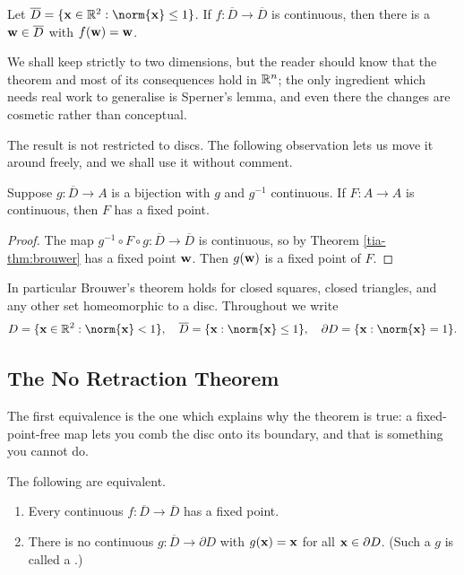 \documentclass[a4paper]{scrartcl}
\newcommand{\dbar}{\overline{D}}
\begin{document}
\begin{theorem}\label{tia-thm:brouwer}
	Let $\dbar = \{\vv{x} \in \R^2 : \norm{\vv{x}} \leq 1\}$. If $f : \dbar \to \dbar$ is continuous, then there is a $\vv{w} \in \dbar$ with $f(\mathbf{w}) = \mathbf{w}$.
\end{theorem}

We shall keep strictly to two dimensions, but the reader should know that the theorem and most of its consequences hold in $\mathbb{R}^n$; the only ingredient which needs real work to generalise is Sperner's lemma, and even there the changes are cosmetic rather than conceptual.

The result is not restricted to discs. The following observation lets us move it around freely, and we shall use it without comment.

\begin{lemma}\label{lem:homeo-transfer}
	Suppose $g : \dbar \to A$ is a bijection with $g$ and $g^{-1}$ continuous. If $F : A \to A$ is continuous, then $F$ has a fixed point.
\end{lemma}

\begin{proof}
	The map $g^{-1} \circ F \circ g : \dbar \to \dbar$ is continuous, so by Theorem \ref{tia-thm:brouwer} has a fixed point $\mathbf{w}$. Then $g(\mathbf{w})$ is a fixed point of $F$.
\end{proof}

In particular Brouwer's theorem holds for closed squares, closed triangles, and any other set homeomorphic to a disc. Throughout we write
$$D = \{\vv{x} \in \R^2 : \norm{\vv{x}}<1\}, \quad \dbar = \{\vv{x}: \norm{\vv{x}}\leq 1\}, \quad \partial D = \{\vv{x} : \norm{\vv{x}}=1\}.$$

\subsection{The No Retraction Theorem}

The first equivalence is the one which explains why the theorem is true: a fixed-point-free map lets you comb the disc onto its boundary, and that is something you cannot do.

\begin{theorem}\label{thm:no-retract}
	The following are equivalent.
	\begin{enumerate}[label=(\roman*)]
		\item Every continuous $f : \dbar \to \dbar$ has a fixed point.
		\item There is no continuous $g : \dbar \to \partial D$ with $g(\mathbf{x}) = \mathbf{x}$ for all $\mathbf{x} \in \partial D$. (Such a $g$ is called a .)
	\end{enumerate}
\end{theorem}
\end{document}
